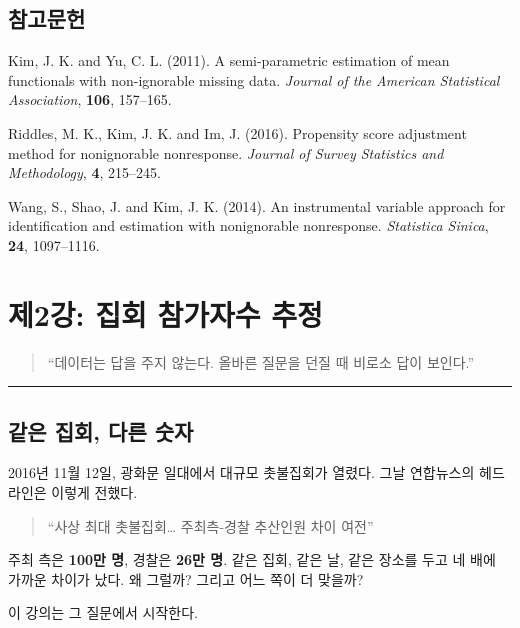 \documentclass[
  letterpaper,
  DIV=11,
  numbers=noendperiod]{scrreprt}
\begin{document}
\section{참고문헌}\label{uxcc38uxace0uxbb38uxd5cc}

Kim, J. K. and Yu, C. L. (2011). A semi-parametric estimation of mean
functionals with non-ignorable missing data. \emph{Journal of the
American Statistical Association}, \textbf{106}, 157--165.

Riddles, M. K., Kim, J. K. and Im, J. (2016). Propensity score
adjustment method for nonignorable nonresponse. \emph{Journal of Survey
Statistics and Methodology}, \textbf{4}, 215--245.

Wang, S., Shao, J. and Kim, J. K. (2014). An instrumental variable
approach for identification and estimation with nonignorable
nonresponse. \emph{Statistica Sinica}, \textbf{24}, 1097--1116.


\chapter{제2강: 집회 참가자수
추정}\label{uxc81c2uxac15-uxc9d1uxd68c-uxcc38uxac00uxc790uxc218-uxcd94uxc815}

\begin{quote}
``데이터는 답을 주지 않는다. 올바른 질문을 던질 때 비로소 답이 보인다.''
\end{quote}

\begin{center}\rule{0.5\linewidth}{0.5pt}\end{center}

\section{같은 집회, 다른
숫자}\label{uxac19uxc740-uxc9d1uxd68c-uxb2e4uxb978-uxc22buxc790}

2016년 11월 12일, 광화문 일대에서 대규모 촛불집회가 열렸다. 그날
연합뉴스의 헤드라인은 이렇게 전했다.

\begin{quote}
``사상 최대 촛불집회\ldots{} 주최측-경찰 추산인원 차이 여전''
\end{quote}

주최 측은 \textbf{100만 명}, 경찰은 \textbf{26만 명}. 같은 집회, 같은
날, 같은 장소를 두고 네 배에 가까운 차이가 났다. 왜 그럴까? 그리고 어느
쪽이 더 맞을까?

이 강의는 그 질문에서 시작한다.
\end{document}
